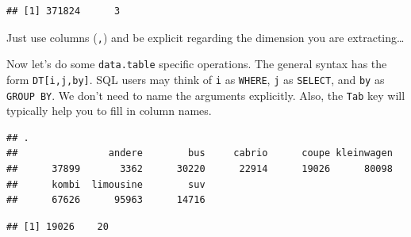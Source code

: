 \documentclass[]{book}
\newenvironment{Shaded}{\begin{snugshade}}{\end{snugshade}}
\newcommand{\CommentTok}[1]{\textcolor[rgb]{0.56,0.35,0.01}{\textit{#1}}}
\newcommand{\DecValTok}[1]{\textcolor[rgb]{0.00,0.00,0.81}{#1}}
\newcommand{\KeywordTok}[1]{\textcolor[rgb]{0.13,0.29,0.53}{\textbf{#1}}}
\newcommand{\NormalTok}[1]{#1}
\newcommand{\OperatorTok}[1]{\textcolor[rgb]{0.81,0.36,0.00}{\textbf{#1}}}
\newcommand{\StringTok}[1]{\textcolor[rgb]{0.31,0.60,0.02}{#1}}
\theoremstyle{definition}
\theoremstyle{definition}
\theoremstyle{definition}
\theoremstyle{remark}
\begin{document}
\begin{Shaded}
\end{Shaded}

\begin{verbatim}
## [1] 371824      3
\end{verbatim}

Just use columns (\texttt{,}) and be explicit regarding the dimension you are extracting\ldots{}

Now let's do some \texttt{data.table} specific operations.
The general syntax has the form \texttt{DT{[}i,j,by{]}}.
SQL users may think of \texttt{i} as \texttt{WHERE}, \texttt{j} as \texttt{SELECT}, and \texttt{by} as \texttt{GROUP\ BY}.
We don't need to name the arguments explicitly.
Also, the \texttt{Tab} key will typically help you to fill in column names.

\begin{Shaded}
\end{Shaded}

\begin{verbatim}
## .
##                andere        bus     cabrio      coupe kleinwagen 
##      37899       3362      30220      22914      19026      80098 
##      kombi  limousine        suv 
##      67626      95963      14716
\end{verbatim}

\begin{Shaded}
\end{Shaded}

\begin{verbatim}
## [1] 19026    20
\end{verbatim}

\begin{Shaded}
\end{Shaded}
\end{document}
